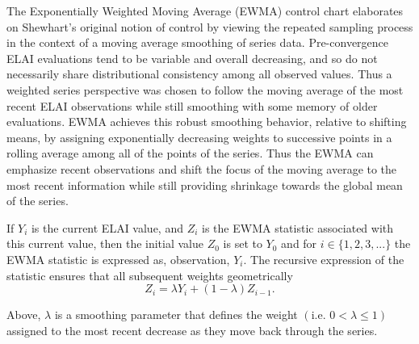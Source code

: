 \documentclass{article}
\begin{document}
%
The Exponentially Weighted Moving Average (EWMA) control chart 
\citep{ewmaPaper, qccPack} elaborates on Shewhart's original notion of control 
by viewing the repeated sampling process in the context of a moving average 
smoothing of series data. Pre-convergence ELAI evaluations tend to be variable 
and overall decreasing, and so do not necessarily share distributional 
consistency among all observed values. 
Thus a weighted series perspective was chosen to follow the moving average of 
the most recent ELAI observations while still smoothing with some memory of 
older evaluations. EWMA achieves this robust smoothing behavior, relative to 
shifting means, by assigning exponentially decreasing weights to successive 
points in a rolling average among all of the points of the series. Thus the 
EWMA can emphasize recent observations and shift the focus of the moving 
average to the most recent information while still providing shrinkage towards 
the global mean of the series.

%
%

%
If $Y_i$ is the current ELAI value, and $Z_i$ is the EWMA statistic associated 
with this current value, then the initial value $Z_0$ is set to $Y_0$ and for 
$i\in\{1, 2, 3, ...\}$ the EWMA statistic is expressed as, observation, $Y_i$. 
The recursive expression of the statistic ensures that all subsequent weights 
geometrically
%
\begin{equation}
Z_i=\lambda Y_i+(1-\lambda)Z_{i-1}.
\label{ewmaStat}
\end{equation}
%

Above, $\lambda$ is a smoothing parameter that defines the weight 
$\left( \text{i.e. }0<\lambda\le1\right)$ assigned to the most recent decrease 
as they move back through the series.
\end{document}
